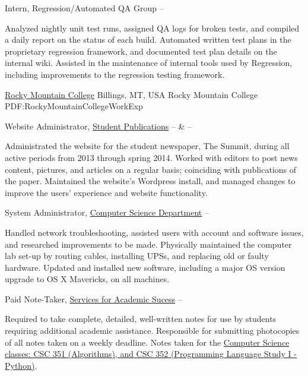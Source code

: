\documentclass[letterpaper,MMMyyyy,nonstopmode]{simpleresumecv}
\begin{document}
\begin{Body}
\Entry
Intern,
Regression/Automated QA Group
\hfill
{} --
\begin{Detail}
\BulletItem
Analyzed nightly unit test runs, assigned QA logs for broken tests, and compiled a daily report on the status of each build.
\BulletItem
Automated written test plans in the proprietary regression framework, and documented test plan details on the internal wiki.
\BulletItem
Assisted in the maintenance of internal tools used by Regression, including improvements to the regression testing framework.
\end{Detail}

\Gap

\SubSection
{\href{http://www.rocky.edu}
{Rocky Mountain College}
\hfill Billings, MT, USA}
{Rocky Mountain College}
{PDF:RockyMountainCollegeWorkExp}

\Entry
Website Administrator,
\href{http://summit.rocky.edu}
{Student Publications}
\hfill
{} --
 \&
 --
\begin{Detail}
\BulletItem
Administrated the website for the student newspaper, The Summit, during all active periods from 2013 through spring 2014.
\BulletItem
Worked with editors to post news content, pictures, and articles on a regular basis; coinciding with publications of the paper.
\BulletItem
Maintained the website's Wordpress install, and managed changes to improve the users' experience and website functionality.
\end{Detail}

\Gap

\Entry
System Administrator,
\href{http://cs.rocky.edu}
{Computer Science Department}
\hfill
{} --
\begin{Detail}
\BulletItem
Handled network troubleshooting, assisted users with account and software issues, and researched improvements to be made.
\BulletItem
Physically maintained the computer lab set-up by routing cables, installing UPSs, and replacing old or faulty hardware.
\BulletItem
Updated and installed new software, including a major OS version upgrade to OS X Mavericks, on all machines.
\end{Detail}

\Gap

\Entry
Paid Note-Taker,
\href{https://www.rocky.edu/student-life/student-support/academic-support/ServicesAcademicSuccess.php}
{Services for Academic Sucess}
\hfill
{} --
\begin{Detail}
\BulletItem
Required to take complete, detailed, well-written notes for use by students requiring additional academic assistance.
\BulletItem
Responsible for submitting photocopies of all notes taken on a weekly deadline.
\BulletItem
Notes taken for the \href{https://www.rocky.edu/academics/catalog/program/9/Computer_Science#courses-content}{Computer Science classes: CSC 351 (Algorithms), and CSC 352 (Programming Language Study I - Python)}.
\end{Detail}


\end{Body}
\end{document}

